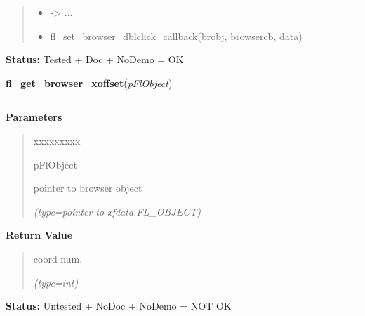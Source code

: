 \begin{boxedminipage}{\funcwidth}
\begin{quote}
\begin{itemize}
  \item {\textbar}-{\textgreater}{\textbar} ...



  \item fl\_set\_browser\_dblclick\_callback(brobj, browsercb, data)



\end{itemize}

\end{quote}

\textbf{Status:} Tested + Doc + NoDemo = OK



    \end{boxedminipage}

    \label{xformslib:flbrowser:fl_get_browser_xoffset}

    \vspace{0.5ex}

\hspace{.8\funcindent}\begin{boxedminipage}{\funcwidth}

    \raggedright \textbf{fl\_get\_browser\_xoffset}(\textit{pFlObject})

    \vspace{-1.5ex}

    \rule{\textwidth}{0.5\fboxrule}
\setlength{\parskip}{2ex}
\setlength{\parskip}{1ex}
      \textbf{Parameters}
      \vspace{-1ex}

      \begin{quote}
        \begin{Ventry}{xxxxxxxxx}

          \item[pFlObject]

          pointer to browser object

            {\it (type=pointer to xfdata.FL\_OBJECT)}

        \end{Ventry}

      \end{quote}

      \textbf{Return Value}
    \vspace{-1ex}

      \begin{quote}
      coord num.

      {\it (type=int)}

      \end{quote}

\textbf{Status:} Untested + NoDoc + NoDemo = NOT OK



    \end{boxedminipage}

